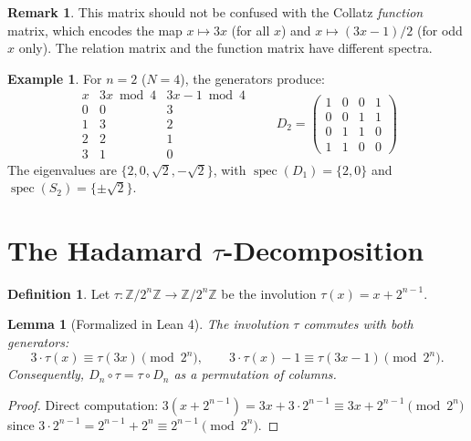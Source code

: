 \documentclass[11pt,reqno]{amsart}
\newtheorem{lemma}[theorem]{Lemma}
\theoremstyle{definition}
\newtheorem{definition}[theorem]{Definition}
\newtheorem{remark}[theorem]{Remark}
\newtheorem{example}[theorem]{Example}
\begin{document}
\begin{remark}
This matrix should not be confused with the Collatz \emph{function} matrix, which encodes the map $x \mapsto 3x$ (for all $x$) and $x \mapsto (3x-1)/2$ (for odd $x$ only). The relation matrix and the function matrix have different spectra.
\end{remark}

\begin{example}
For $n = 2$ ($N = 4$), the generators produce:
\[
\begin{array}{c|cc}
x & 3x \bmod 4 & 3x-1 \bmod 4 \\ \hline
0 & 0 & 3 \\
1 & 3 & 2 \\
2 & 2 & 1 \\
3 & 1 & 0
\end{array}
\qquad
D_2 = \begin{pmatrix} 1 & 0 & 0 & 1 \\ 0 & 0 & 1 & 1 \\ 0 & 1 & 1 & 0 \\ 1 & 1 & 0 & 0 \end{pmatrix}
\]
The eigenvalues are $\{2, 0, \sqrt{2}, -\sqrt{2}\}$, with $\operatorname{spec}(D_1) = \{2, 0\}$ and $\operatorname{spec}(S_2) = \{\pm\sqrt{2}\}$.
\end{example}

\section{The Hadamard $\tau$-Decomposition}\label{sec:hadamard}

\begin{definition}
Let $\tau \colon \mathbb{Z}/2^n\mathbb{Z} \to \mathbb{Z}/2^n\mathbb{Z}$ be the involution $\tau(x) = x + 2^{n-1}$.
\end{definition}

\begin{lemma}[Formalized in Lean 4]\label{lem:tau-commute}
The involution $\tau$ commutes with both generators:
\[
3 \cdot \tau(x) \equiv \tau(3x) \pmod{2^n}, \qquad 3 \cdot \tau(x) - 1 \equiv \tau(3x - 1) \pmod{2^n}.
\]
Consequently, $D_n \circ \tau = \tau \circ D_n$ as a permutation of columns.
\end{lemma}

\begin{proof}
Direct computation: $3(x + 2^{n-1}) = 3x + 3 \cdot 2^{n-1} \equiv 3x + 2^{n-1} \pmod{2^n}$ since $3 \cdot 2^{n-1} = 2^{n-1} + 2^n \equiv 2^{n-1} \pmod{2^n}$.
\end{proof}
\end{document}
